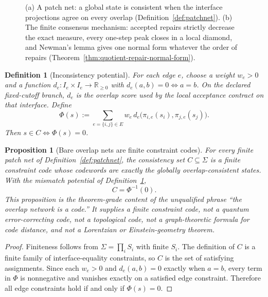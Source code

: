 \documentclass[11pt]{article}
\newtheorem{definition}[theorem]{Definition}
\newtheorem{proposition}[theorem]{Proposition}
\theoremstyle{remark}
\theoremstyle{plain}
\begin{document}
\begin{figure}[!htb]
\centering

\caption{(a) A patch net: a global state is consistent when the interface projections agree on every overlap (Definition~\ref{def:patchnet}). (b) The finite consensus mechanism: accepted repairs strictly decrease the exact measure, every one-step peak closes in a local diamond, and Newman's lemma gives one normal form whatever the order of repairs (Theorem~\ref{thm:quotient-repair-normal-form}).}
\label{fig:consensus}
\end{figure}

\begin{definition}[Inconsistency potential]\label{def:potential}
For each edge $e$, choose a weight $w_e>0$ and a function $d_e:I_e\times I_e\to\mathbb{R}_{\ge 0}$ with $d_e(a,b)=0 \iff a=b$. On the declared fixed-cutoff branch, \(d_e\) is the overlap score used by the local acceptance contract on that interface. Define
\[
\Phi(s)
:=
\sum_{e=\{i,j\}\in E}
w_e\, d_e\!\bigl(\pi_{i,e}(s_i),\pi_{j,e}(s_j)\bigr).
\]
Then $s\in C \iff \Phi(s)=0$.
\end{definition}

\begin{proposition}[Bare overlap nets are finite constraint codes]\label{prop:constraint-code}
For every finite patch net of Definition~\ref{def:patchnet}, the consistency set \(C\subseteq
\Sigma\) is a finite constraint code whose codewords are exactly the globally overlap-consistent
states. With the mismatch potential of Definition~\ref{def:potential},
\[
C=\Phi^{-1}(0).
\]
This proposition is the theorem-grade content of the unqualified phrase ``the overlap network is
a code.'' It supplies a finite constraint code, not a quantum error-correcting code, not a
topological code, not a graph-theoretic formula for code distance, and not a Lorentzian or
Einstein-geometry theorem.
\end{proposition}

\begin{proof}
Finiteness follows from \(\Sigma=\prod_i S_i\) with finite \(S_i\). The definition of \(C\) is a
finite family of interface-equality constraints, so \(C\) is the set of satisfying assignments.
Since each \(w_e>0\) and \(d_e(a,b)=0\) exactly when \(a=b\), every term in \(\Phi\) is
nonnegative and vanishes exactly on a satisfied edge constraint. Therefore all edge constraints
hold if and only if \(\Phi(s)=0\).
\end{proof}
\end{document}
